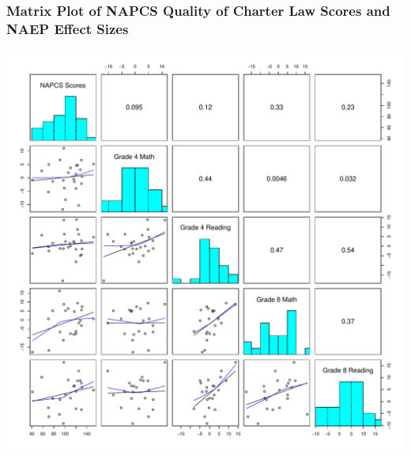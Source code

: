 \documentclass[10pt,handout,mathserif]{beamer}
\begin{document}
\begin{frame}[c]
	\frametitle{Matrix Plot of NAPCS Quality of Charter Law Scores and NAEP Effect Sizes}
	\begin{center}
	\includegraphics[height=.8\textheight,keepaspectratio]{../Figures2009/NAEPLawScoresMatrixPlot}
	\end{center}
\end{frame}
\end{document}
